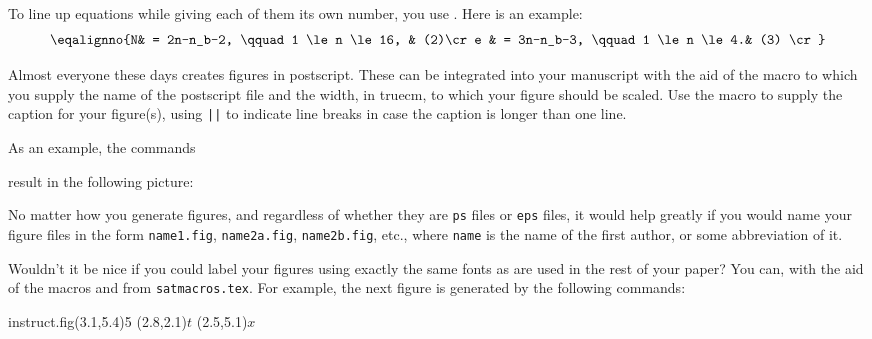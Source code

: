 To line up equations while
giving each of them its own number, you use .
Here is an example:
$$\eqalignno{N& =  2n-n_b-2, \qquad 1 \le n \le 16, & (2)\cr
            e & =  3n-n_b-3, \qquad 1 \le n \le 4.& (3) \cr}$$

Almost everyone these days creates figures in postscript.  These
can be integrated into your manuscript with the aid of the macro
 to which you supply the name of the postscript
file and the width, in truecm, to which your figure should be scaled.
Use the macro  to supply the caption for your figure(s),
using {\tt ||} to indicate line breaks in case the caption is longer than
one line.

As an example, the commands

 result in the following
picture:

No matter how you generate figures, and regardless of whether they
are {\tt ps} files or {\tt eps} files, it would help greatly if you would name
your figure files in the form {\tt name1.fig}, {\tt name2a.fig},
{\tt name2b.fig}, etc., where {\tt name} is the name of the first
author, or some abbreviation of it.

Wouldn't it be nice if you could label your figures using exactly the same
fonts as are used in the rest of your paper? You can, with the aid of the
macros  and  from {\tt satmacros.tex}. For example,
the next figure is generated by the following commands:



\showgridfalse
\figinbox instruct.fig(3.1,5.4){5}{
(2.8,2.1){$t$}
(2.5,5.1){$x$}}

